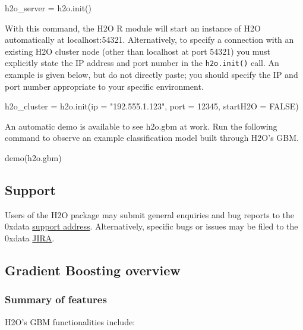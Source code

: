 \documentclass[11pt]{article}
\begin{document}
\begin{spverbatim}
h2o_server = h2o.init()

\end{spverbatim}
\noindent
With this command, the H2O R module will start an instance of H2O automatically at localhost:54321. Alternatively,  to specify a connection with an existing H2O cluster node (other than localhost at port 54321) you must explicitly state the IP address and port number in the \texttt{h2o.init()} call. An example is given below, but do not directly paste; you should specify the IP and port number appropriate to your specific environment.

\begin{spverbatim}
h2o_cluster = h2o.init(ip = "192.555.1.123", port = 12345, startH2O = FALSE)

\end{spverbatim}
\noindent
An automatic demo is available to see h2o.gbm at work. Run the following command to observe an example classification model built through H2O's GBM.

\begin{spverbatim}
demo(h2o.gbm)
\end{spverbatim}

\subsection{Support} \label{1.2}

Users of the H2O package may submit general enquiries and bug reports to the 0xdata \href{h2ostream@googlegroups.com}{support address}. Alternatively, specific bugs or issues may be filed to the 0xdata \href{https://0xdata.atlassian.net/secure/Dashboard.jspa}{JIRA}.

\subsection{Gradient Boosting overview} \label{1.3}

\subsubsection{Summary of features} \label{2.1}
H2O's GBM functionalities include:
\end{document}
